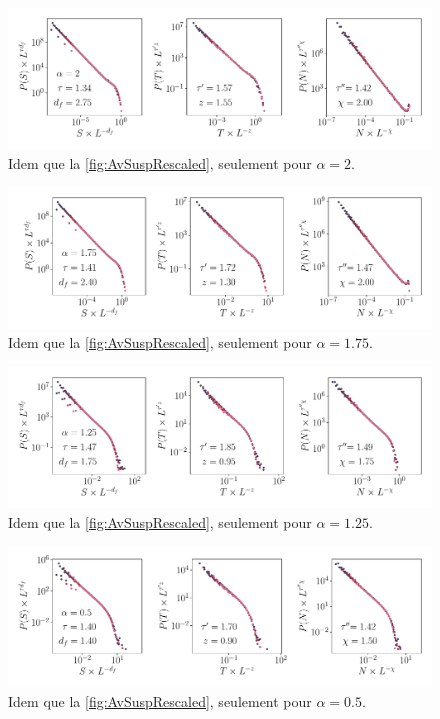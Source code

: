 \begin{figure}[h]
\centering
\includegraphics[width=\textwidth]{Chapitre3/Figures/Avalanches/Rescale_Av_alpha2.pdf}
\caption{Idem que la \autoref{fig:AvSuspRescaled}, seulement pour $\alpha=2$.}
	\label{fig:annexAv2}
\end{figure}

\begin{figure}[h]
\centering
\includegraphics[width=\textwidth]{Chapitre3/Figures/Avalanches/Rescale_Av_alpha175.pdf}
\caption{Idem que la \autoref{fig:AvSuspRescaled}, seulement pour $\alpha=1.75$.}
	\label{fig:annexAv3}
\end{figure}

\begin{figure}[h]
\centering
\includegraphics[width=\textwidth]{Chapitre3/Figures/Avalanches/Rescale_Av_alpha125.pdf}
\caption{Idem que la \autoref{fig:AvSuspRescaled}, seulement pour $\alpha=1.25$.}
	\label{fig:annexAv4}
\end{figure}

\begin{figure}[h]
\centering
\includegraphics[width=\textwidth]{Chapitre3/Figures/Avalanches/Rescale_Av_alpha05.pdf}
\caption{Idem que la \autoref{fig:AvSuspRescaled}, seulement pour $\alpha=0.5$.}
	\label{fig:annexAv5}
\end{figure}


